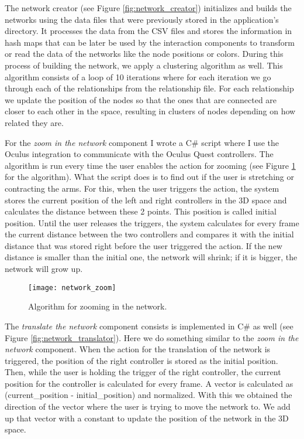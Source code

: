 The network creator (see Figure \ref{fig:network_creator}) initializes and builds the networks using the data files that were previously stored in the application's directory. It processes the data from the CSV files and stores the information in hash maps that can be later be used by the interaction components to transform or read the data of the networks like the node positions or colors. During this process of building the network, we apply a clustering algorithm as well. This algorithm consists of a loop of 10 iterations where for each iteration we go through each of the relationships from the relationship file. For each relationship we update the position of the nodes so that the ones that are connected are closer to each other in the space, resulting in clusters of nodes depending on how related they are.

For the \textit{zoom in the network} component I wrote a C\# script where I use the Oculus integration to communicate with the Oculus Quest controllers. The algorithm is run every time the user enables the action for zooming (see Figure \ref{fig:network_zoom} for the algorithm). What the script does is to find out if the user is stretching or contracting the arms. For this, when the user triggers the action, the system stores the current position of the left and right controllers in the 3D space and calculates the distance between these 2 points. This position is called initial position. Until the user releases the triggers, the system calculates for every frame the current distance between the two controllers and compares it with the initial distance that was stored right before the user triggered the action. If the new distance is smaller than the initial one, the network will shrink; if it is bigger, the network will grow up.

\begin{figure}[h!]
    \centering%
    \texttt{[image: network\_zoom]}
    \caption{Algorithm for zooming in the network.}
    \label{fig:network_zoom}
\end{figure}%

The \textit{translate the network} component consists is implemented in C\# as well (see Figure \ref{fig:network_translator}). Here we do something similar to the \textit{zoom in the network} component. When the action for the translation of the network is triggered, the position of the right controller is stored as the initial position. Then, while the user is holding the trigger of the right controller, the current position for the controller is calculated for every frame. A vector is calculated as (current\_position - initial\_position) and normalized. With this we obtained the direction of the vector where the user is trying to move the network to. We add up that vector with a constant to update the position of the network in the 3D space.

